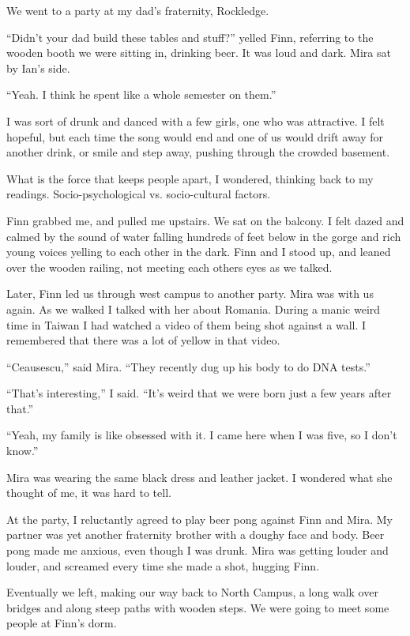 We went to a party at my dad's fraternity, Rockledge.  

``Didn't your dad build these tables and stuff?'' yelled Finn, referring to the
wooden booth we were sitting in, drinking beer.  It was loud and dark.  Mira sat by
Ian's side.  

``Yeah.  I think he spent like a whole semester on them.''

I was sort of drunk and danced with a few girls, one who was attractive.  I felt
hopeful, but each time the song would end and one of us would drift away for
another drink, or smile and step away, pushing through the crowded basement.  

What is the force that keeps people apart, I wondered, thinking back to my
readings.  Socio-psychological vs. socio-cultural factors. 

Finn grabbed me, and pulled me upstairs.  We sat on the balcony.  I felt dazed
and calmed by the sound of water falling hundreds of feet below in the gorge and
rich young voices yelling to each other in the dark.  Finn and I stood up, and
leaned over the wooden railing, not meeting each others eyes as we talked.

Later, Finn led us through west campus to another party.  Mira was with us
again.  As we walked I talked with her about Romania.  During a manic weird time
in Taiwan I had watched a video of them being shot against a wall.  I remembered
that there was a lot of yellow in that video.  

``Ceausescu,'' said Mira.  ``They recently dug up his body to do DNA tests.''  

``That's interesting,'' I said.  ``It's weird that we were born just a few years
after that.''  

``Yeah, my family is like obsessed with it.  I came here when I was five, so I
don't know.''

Mira was wearing the same black dress and leather jacket.  I wondered what she
thought of me, it was hard to tell.

At the party, I reluctantly agreed to play beer pong against Finn and Mira.  My
partner was yet another fraternity brother with a doughy face and body.  Beer
pong made me anxious, even though I was drunk.  Mira was getting louder and
louder, and screamed every time she made a shot, hugging Finn.

Eventually we left, making our way back to North Campus, a long walk over
bridges and along steep paths with wooden steps.  We were going to meet
some people at Finn's dorm. 

